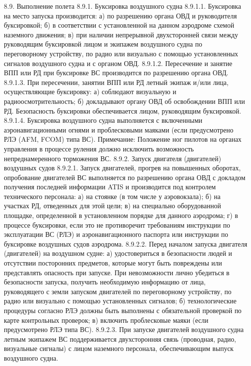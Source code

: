 8.9. Выполнение полета
8.9.1. Буксировка воздушного судна 
8.9.1.1. Буксировка на место запуска производится: 
а)	по разрешению органа ОВД и руководителя буксировкой; 
б)	в соответствии с установленной на данном аэродроме схемой наземного движения; 
в)	при наличии непрерывной двухсторонней связи между руководящим буксировкой лицом и экипажем воздушного судна по переговорному устройству, по радио или визуально с помощью установленных сигналов воздушного судна и с органом ОВД. 
8.9.1.2. Пересечение и занятие ВПП или РД при буксировке ВС производится по разрешению органа ОВД. 
8.9.1.3. При пересечении, занятии ВПП или РД летный экипаж и/или лица, осуществляющие буксировку: 
а)	соблюдают визуальную и радиоосмотрительность; 
б)	докладывают органу ОВД об освобождении ВПП или РД. 
Безопасность буксировки обеспечивается лицом, руководящим буксировкой. 
8.9.1.4. Буксировка воздушного судна выполняется с включенными аэронавигационными огнями и проблесковыми маяками (если предусмотрено РЛЭ (AFM, FCOM) типа ВС). 
Примечание: Положение ног пилотов на органах управления в процессе руления должно исключить возможность непреднамеренного торможения ВС.
8.9.2. Запуск двигателя (двигателей) воздушных судов
8.9.2.1. Запуск двигателей, прогрев на повышенных оборотах, опробование двигателей ВС выполняется по разрешению органа ОВД с докладом получения последней информации ATIS и производится под контролем технического персонала: 
а)	на стоянке (в том числе у аэровокзала); 
б)	на участках РД, отведенных для этой цели; 
в)	на специально оборудованной площадке, определенной в установленном порядке для данного аэродрома; 
г)	в процессе буксировки, если это не противоречит требованиям инструкции по эксплуатации ВС (РЛЭ) и аэронавигационного паспорта или инструкции по буксировке воздушных судов аэродрома. 
8.9.2.2. Перед началом запуска двигателя (двигателей) на воздушном судне: 
а)	удостовериться в безопасности людей и отсутствии посторонних предметов, которые могут быть повреждены или представлять опасность при запуске. При невозможности лично убедиться в безопасности запуска, получить необходимую информацию от лица, руководящего с земли запуском двигателей по переговорному устройству, по радио или визуально с помощью установленных сигналов;
б)	технологические процедуры согласно РЛЭ должны быть выполнены с обязательной проверкой по карте контрольных проверок; 
в)	включить проблесковые маяки (если предусмотрено РЛЭ типа ВС).
8.9.2.3. При запуске двигателей воздушного судна летным экипажем ВС поддерживается двухсторонняя связь (проводная, радио, визуальные сигналы) с лицом наземного персонала, обеспечивающим выпуск воздушного судна.
